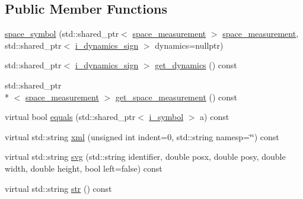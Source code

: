 \subsection*{Public Member Functions}
\begin{DoxyCompactItemize}
\item 
\hyperlink{classmae_1_1fl_1_1laban_1_1mv_1_1space__symbol_ad39b3f3dbd05a06071f246680b175882}{space\-\_\-symbol} (std\-::shared\-\_\-ptr$<$ \hyperlink{classmae_1_1fl_1_1laban_1_1mv_1_1space__measurement}{space\-\_\-measurement} $>$ \hyperlink{classmae_1_1fl_1_1laban_1_1mv_1_1space__measurement}{space\-\_\-measurement}, std\-::shared\-\_\-ptr$<$ \hyperlink{classmae_1_1fl_1_1laban_1_1mv_1_1i__dynamics__sign}{i\-\_\-dynamics\-\_\-sign} $>$ dynamics=nullptr)
\item 
std\-::shared\-\_\-ptr$<$ \hyperlink{classmae_1_1fl_1_1laban_1_1mv_1_1i__dynamics__sign}{i\-\_\-dynamics\-\_\-sign} $>$ \hyperlink{classmae_1_1fl_1_1laban_1_1mv_1_1space__symbol_a5105e434045f777e6a0650c063ed815d}{get\-\_\-dynamics} () const 
\item 
std\-::shared\-\_\-ptr\\*
$<$ \hyperlink{classmae_1_1fl_1_1laban_1_1mv_1_1space__measurement}{space\-\_\-measurement} $>$ \hyperlink{classmae_1_1fl_1_1laban_1_1mv_1_1space__symbol_a090197af87afa823482359b9be18cb36}{get\-\_\-space\-\_\-measurement} () const 
\item 
virtual bool \hyperlink{classmae_1_1fl_1_1laban_1_1mv_1_1space__symbol_a9079a63e55fca3b2e8232fed1ef65e06}{equals} (std\-::shared\-\_\-ptr$<$ \hyperlink{classmae_1_1fl_1_1laban_1_1mv_1_1i__symbol}{i\-\_\-symbol} $>$ a) const 
\item 
virtual std\-::string \hyperlink{classmae_1_1fl_1_1laban_1_1mv_1_1space__symbol_a5aa4290ae8e7473dc5d0ef435f3035b7}{xml} (unsigned int indent=0, std\-::string namesp=\char`\"{}\char`\"{}) const 
\item 
virtual std\-::string \hyperlink{classmae_1_1fl_1_1laban_1_1mv_1_1space__symbol_ae6c9b408da1fcbc53881471035b496bd}{svg} (std\-::string identifier, double posx, double posy, double width, double height, bool left=false) const 
\item 
virtual std\-::string \hyperlink{classmae_1_1fl_1_1laban_1_1mv_1_1space__symbol_ac528043832637bf9186a3dda3604c418}{str} () const 
\end{DoxyCompactItemize}
